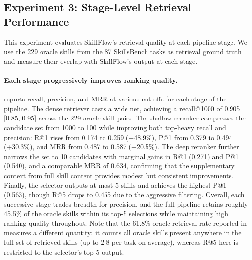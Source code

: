 \documentclass[11pt]{article}
\begin{document}
\subsection{Experiment 3: Stage-Level Retrieval Performance}
\label{sec:experiment_retrieval}

This experiment evaluates SkillFlow's retrieval quality at each pipeline stage.
We use the 229 oracle skills from the 87 SkillsBench tasks as retrieval ground truth and measure their overlap with SkillFlow's output at each stage.

\begin{table}[t]
  \centering
  \caption{Stage-level retrieval performance.
  Recall (R), precision (P), and mean reciprocal rank (MRR) across each stage of the SkillFlow retrieval pipeline.
  Inapplicable cells (where $k$ exceeds the stage output size) are marked with dashes.
  K output denotes the number of candidates produced by each stage.}
  \label{tab:retrieval_stages}
  
\end{table}

\paragraph{Each stage progressively improves ranking quality.}
 reports recall, precision, and MRR at various cut-offs for each stage of the pipeline.
The dense retriever casts a wide net, achieving a recall@1000 of 0.905 [0.85, 0.95] across the 229 oracle skill pairs.
The shallow reranker compresses the candidate set from 1000 to 100 while improving both top-heavy recall and precision: R@1 rises from 0.174 to 0.259 (+48.9\%), P@1 from 0.379 to 0.494 (+30.3\%), and MRR from 0.487 to 0.587 (+20.5\%).
The deep reranker further narrows the set to 10 candidates with marginal gains in R@1 (0.271) and P@1 (0.540), and a comparable MRR of 0.634, confirming that the supplementary context from full skill content provides modest but consistent improvements.
Finally, the selector outputs at most 5 skills and achieves the highest P@1 (0.563), though R@5 drops to 0.455 due to the aggressive filtering.
Overall, each successive stage trades breadth for precision, and the full pipeline retains roughly 45.5\% of the oracle skills within its top-5 selections while maintaining high ranking quality throughout.
Note that the 61.8\% oracle retrieval rate reported in  measures a different quantity: it counts all oracle skills present anywhere in the full set of retrieved skills (up to 2.8 per task on average), whereas R@5 here is restricted to the selector's top-5 output.
\end{document}
